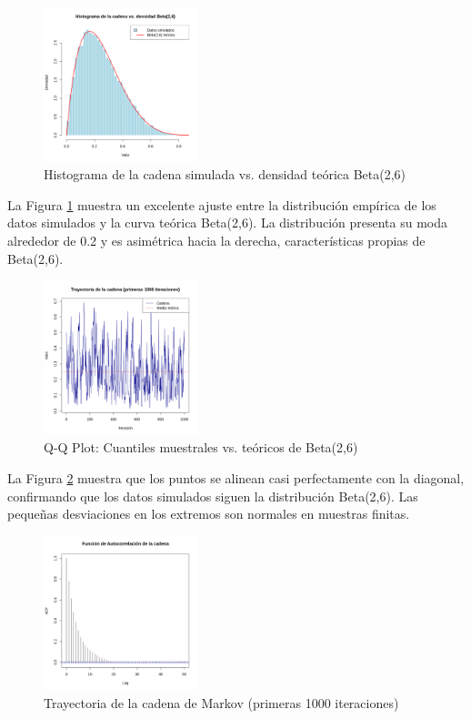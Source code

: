\documentclass[12pt,a4paper]{article}
\begin{document}
\begin{figure}[h]
\centering
\includegraphics[width=0.4\textwidth]{images/problem2_1.png}
\caption{Histograma de la cadena simulada vs. densidad teórica Beta(2,6)}
\label{fig:histograma_beta}
\end{figure}

La Figura \ref{fig:histograma_beta} muestra un excelente ajuste entre la distribución empírica de los datos simulados y la curva teórica Beta(2,6). La distribución presenta su moda alrededor de 0.2 y es asimétrica hacia la derecha, características propias de Beta(2,6). \\

\begin{figure}[h]
\centering
\includegraphics[width=0.4\textwidth]{images/problem2_2.png}
\caption{Q-Q Plot: Cuantiles muestrales vs. teóricos de Beta(2,6)}
\label{fig:qqplot_beta}
\end{figure}

La Figura \ref{fig:qqplot_beta} muestra que los puntos se alinean casi perfectamente con la diagonal, confirmando que los datos simulados siguen la distribución Beta(2,6). Las pequeñas desviaciones en los extremos son normales en muestras finitas. \\

\begin{figure}[h]
\centering
\includegraphics[width=0.4\textwidth]{images/problem2_3.png}
\caption{Trayectoria de la cadena de Markov (primeras 1000 iteraciones)}
\label{fig:trayectoria_beta}
\end{figure}
\end{document}
